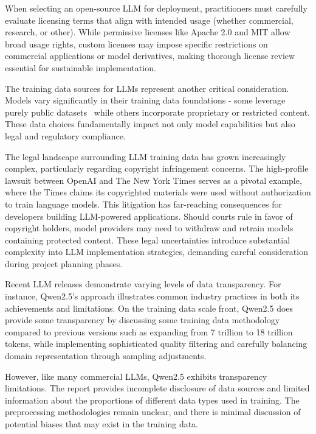 When selecting an open-source LLM for deployment, practitioners must carefully evaluate licensing terms that align with intended usage (whether commercial, research, or other). While permissive licenses like Apache 2.0 and MIT allow broad usage rights, custom licenses may impose specific restrictions on commercial applications or model derivatives, making thorough license review essential for sustainable implementation.

The training data sources for LLMs represent another critical consideration. Models vary significantly in their training data foundations - some leverage purely public datasets~ while others incorporate proprietary or restricted content. These data choices fundamentally impact not only model capabilities but also legal and regulatory compliance.

The legal landscape surrounding LLM training data has grown increasingly complex, particularly regarding copyright infringement concerns. The high-profile lawsuit between OpenAI and The New York Times  serves as a pivotal example, where the Times claims its copyrighted materials were used without authorization to train language models. This litigation has far-reaching consequences for developers building LLM-powered applications. Should courts rule in favor of copyright holders, model providers may need to withdraw and retrain models containing protected content. These legal uncertainties introduce substantial complexity into LLM implementation strategies, demanding careful consideration during project planning phases.

Recent LLM releases demonstrate varying levels of data transparency. For instance, Qwen2.5's approach  illustrates common industry practices in both its achievements and limitations. On the training data scale front, Qwen2.5 does provide some transparency by discussing some training data methodology compared to previous versions such as expanding from 7 trillion to 18 trillion tokens, while implementing sophisticated quality filtering and carefully balancing domain representation through sampling adjustments.

However, like many commercial LLMs, Qwen2.5 exhibits transparency limitations. The report provides incomplete disclosure of data sources and limited information about the proportions of different data types used in training. The preprocessing methodologies remain unclear, and there is minimal discussion of potential biases that may exist in the training data. 

